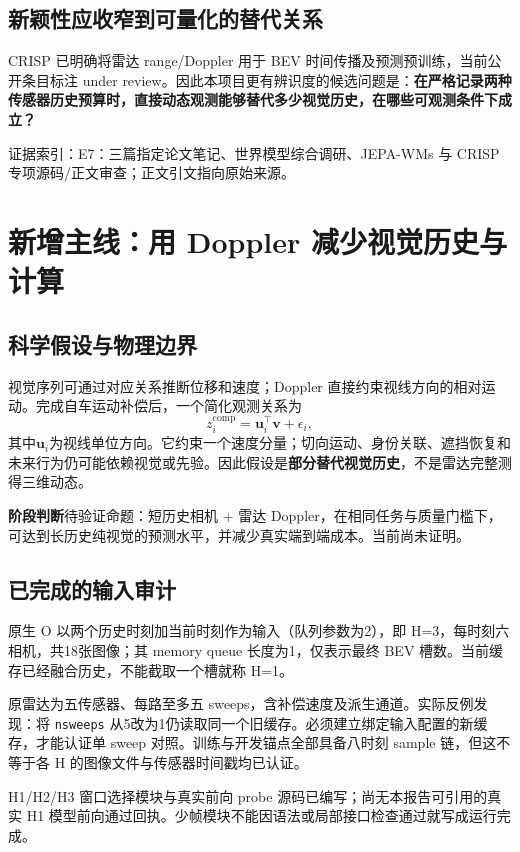 \documentclass[UTF8,a4paper,11pt,fontset=none]{ctexart}
\newcommand{\pending}[1]{\textcolor{pendingred}{#1}}
\newcommand{\evidence}[1]{{\footnotesize\color{muted}\par\noindent 证据索引：#1。\par}}
\newcommand{\takeaway}[1]{\par\noindent\colorbox{pale}{\parbox{\dimexpr\linewidth-2\fboxsep}{\vspace{3pt}\textbf{阶段判断}\quad #1\vspace{3pt}}}\par}
\begin{document}
\subsection{新颖性应收窄到可量化的替代关系}
CRISP 已明确将雷达 range/Doppler 用于 BEV 时间传播及预测预训练，当前公开条目标注 under review\cite{crisp}。因此本项目更有辨识度的候选问题是：\textbf{在严格记录两种传感器历史预算时，直接动态观测能够替代多少视觉历史，在哪些可观测条件下成立？}

\evidence{E7：三篇指定论文笔记、世界模型综合调研、JEPA-WMs 与 CRISP 专项源码/正文审查；正文引文指向原始来源}

\clearpage
\section{新增主线：用 Doppler 减少视觉历史与计算}
\subsection{科学假设与物理边界}
视觉序列可通过对应关系推断位移和速度；Doppler 直接约束视线方向的相对运动。完成自车运动补偿后，一个简化观测关系为
\[
 z_i^{\mathrm{comp}}=\mathbf u_i^\top\mathbf v+\epsilon_i,
\]
其中$\mathbf u_i$为视线单位方向。它约束一个速度分量；切向运动、身份关联、遮挡恢复和未来行为仍可能依赖视觉或先验。因此假设是\textbf{部分替代视觉历史}，不是雷达完整测得三维动态。

\takeaway{待验证命题：短历史相机 + 雷达 Doppler，在相同任务与质量门槛下，可达到长历史纯视觉的预测水平，并减少真实端到端成本。当前尚未证明。}

\subsection{已完成的输入审计}
原生 O 以两个历史时刻加当前时刻作为输入（队列参数为2），即 H=3，每时刻六相机，共18张图像；其 memory queue 长度为1，仅表示最终 BEV 槽数。当前缓存已经融合历史，不能截取一个槽就称 H=1。

原雷达为五传感器、每路至多五 sweeps，含补偿速度及派生通道。实际反例发现：将 \texttt{nsweeps} 从5改为1仍读取同一个旧缓存。必须建立绑定输入配置的新缓存，才能认证单 sweep 对照。训练与开发锚点全部具备八时刻 sample 链，但这不等于各 H 的图像文件与传感器时间戳均已认证。

H1/H2/H3 窗口选择模块与真实前向 probe 源码已编写；\pending{尚无本报告可引用的真实 H1 模型前向通过回执}。少帧模块不能因语法或局部接口检查通过就写成运行完成。
\end{document}
